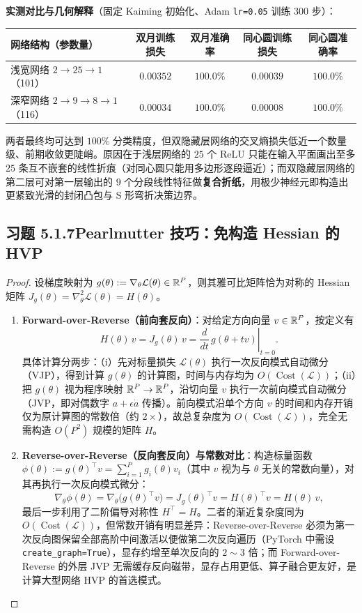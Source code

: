 \textbf{实测对比与几何解释}（固定 Kaiming 初始化、Adam \texttt{lr=0.05} 训练 300 步）：
\begin{center}
\small
\begin{tabular}{@{}lcccc@{}}
\toprule
网络结构（参数量） & 双月训练损失 & 双月准确率 & 同心圆训练损失 & 同心圆准确率 \\
\midrule
浅宽网络 $2 \to 25 \to 1$（101） & $0.00352$ & $100.0\%$ & $0.00039$ & $100.0\%$ \\
深窄网络 $2 \to 9 \to 8 \to 1$（116） & $0.00034$ & $100.0\%$ & $0.00008$ & $100.0\%$ \\
\bottomrule
\end{tabular}
\end{center}
两者最终均可达到 $100\%$ 分类精度，但双隐藏层网络的交叉熵损失低近一个数量级、前期收敛更陡峭。原因在于浅层网络的 $25$ 个 ReLU 只能在输入平面画出至多 $25$ 条互不嵌套的线性折痕（对同心圆只能用多边形逐段逼近）；而双隐藏层网络的第二层可对第一层输出的 $9$ 个分段线性特征做\textbf{复合折纸}，用极少神经元即构造出更紧致光滑的封闭凸包与 S 形弯折决策边界。

\subsection*{习题 5.1.7\quad Pearlmutter 技巧：免构造 Hessian 的 HVP}
\begin{proof}
设梯度映射为 $g(\theta) := \nabla_\theta \mathcal{L}(\theta) \in \mathbb{R}^P$，则其雅可比矩阵恰为对称的 Hessian 矩阵 $J_g(\theta) = \nabla^2_\theta \mathcal{L}(\theta) = H(\theta)$。
\begin{enumerate}[label=(\arabic*), leftmargin=1.8em]
  \item \textbf{Forward-over-Reverse（前向套反向）}：对给定方向向量 $v \in \mathbb{R}^P$，按定义有
  \[
    H(\theta)\, v = J_g(\theta)\, v = \left.\frac{d}{dt}\, g(\theta + t v)\right|_{t=0}.
  \]
  具体计算分两步：（i）先对标量损失 $\mathcal{L}(\theta)$ 执行一次反向模式自动微分（VJP），得到计算 $g(\theta)$ 的计算图，时间与内存均为 $O(\operatorname{Cost}(\mathcal{L}))$；（ii）把 $g(\theta)$ 视为程序映射 $\mathbb{R}^P \to \mathbb{R}^P$，沿切向量 $v$ 执行一次前向模式自动微分（JVP，即对偶数字 $a + \epsilon \dot{a}$ 传播）。前向模式沿单个方向 $v$ 的时间和内存开销仅为原计算图的常数倍（约 $2\times$），故总复杂度为 $O(\operatorname{Cost}(\mathcal{L}))$，完全无需构造 $O(P^2)$ 规模的矩阵 $H$。

  \item \textbf{Reverse-over-Reverse（反向套反向）与常数对比}：构造标量函数 $\phi(\theta) := g(\theta)^\top v = \sum_{i=1}^P g_i(\theta) v_i$（其中 $v$ 视为与 $\theta$ 无关的常数向量），对其再执行一次反向模式微分：
  \[
    \nabla_\theta \phi(\theta) = \nabla_\theta \big(g(\theta)^\top v\big) = J_g(\theta)^\top v = H(\theta)^\top v = H(\theta)\, v,
  \]
  最后一步利用了二阶偏导对称性 $H^\top = H$。二者的渐近复杂度同为 $O(\operatorname{Cost}(\mathcal{L}))$，但常数开销有明显差异：Reverse-over-Reverse 必须为第一次反向图保留全部高阶中间激活以便做第二次反向遍历（PyTorch 中需设 \texttt{create\_graph=True}），显存约增至单次反向的 $2\sim 3$ 倍；而 Forward-over-Reverse 的外层 JVP 无需缓存反向磁带，显存占用更低、算子融合更友好，是计算大型网络 HVP 的首选模式。
\end{enumerate}
\end{proof}

